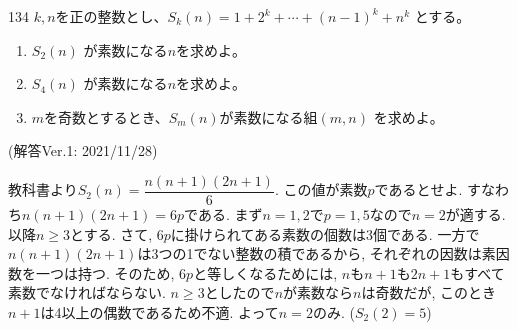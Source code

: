 \begin{prob}{134}{}{}
 $k, n$を正の整数とし、$S_k(n)=1+2^k+\cdots+(n-1)^k+n^k$ とする。
 \begin{enumerate}
  \item $S_2(n)$ が素数になる$n$を求めよ。 
  \item $S_4(n)$ が素数になる$n$を求めよ。 
  \item $m$を奇数とするとき、$S_m(n)$が素数になる組$(m,n)$ を求めよ。 
 \end{enumerate}
\end{prob}
(解答Ver.1: 2021/11/28)


教科書より$S_2(n) = \dfrac{n(n+1)(2n+1)}{6}$. この値が素数$p$であるとせよ. すなわち$n(n+1)(2n+1) = 6p$である. まず$n=1,2$で$p=1,5$なので$n=2$が適する. 以降$n\geq 3$とする. さて, $6p$に掛けられてある素数の個数は3個である. 一方で$n(n+1)(2n+1)$は3つの1でない整数の積であるから, それぞれの因数は素因数を一つは持つ. そのため, $6p$と等しくなるためには, $n$も$n+1$も$2n+1$もすべて素数でなければならない. $n\geq 3$としたので$n$が素数なら$n$は奇数だが, このとき$n+1$は4以上の偶数であるため不適. よって$n=2$のみ. ($S_2(2)=5$)

